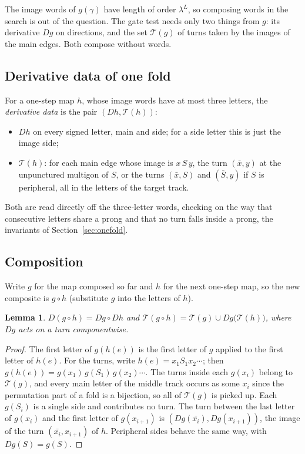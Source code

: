 \documentclass[12pt]{amsart}
\newcommand{\anti}[1]{\bar{#1}}          %
\newcommand{\Dg}{D}                       %
\newcommand{\turns}{\mathcal{T}}
\newcommand{\lam}{\lambda}
\theoremstyle{plain}
\newtheorem{Lemma}[Theorem]{Lemma}
\theoremstyle{definition}
\begin{document}
The image words of $g(\gamma)$ have length of order $\lam^L$, so composing
words in the search is out of the question.  The gate test needs only
two things from $g$: its derivative $\Dg g$ on directions, and the set
$\turns(g)$ of turns taken by the images of the main edges.  Both
compose without words.

\subsection{Derivative data of one fold}
For a one-step map $h$, whose image words have at most three letters,
the \emph{derivative data} is the pair $(\Dg h,\turns(h))$:
\begin{itemize}
  \item $\Dg h$ on every signed letter, main and side; for a side letter
    this is just the image side;
  \item $\turns(h)$: for each main edge whose image is $x\,S\,y$, the
    turn $(\anti x,y)$ at the unpunctured multigon of $S$, or the turns
    $(\anti x,S)$ and $(\anti S,y)$ if $S$ is peripheral, all in the
    letters of the target track.
\end{itemize}
Both are read directly off the three-letter words, checking on the way
that consecutive letters share a prong and that no turn falls inside a
prong, the invariants of Section~\ref{sec:onefold}.

\subsection{Composition}
Write $g$ for the map composed so far and $h$ for the next one-step map,
so the new composite is $g\circ h$ (substitute $g$ into the letters of
$h$).

\begin{Lemma}
  \label{lem:compose}
  $\Dg(g\circ h)=\Dg g\circ\Dg h$ and
  $\turns(g\circ h)=\turns(g)\cup\Dg g\bigl(\turns(h)\bigr)$, where
  $\Dg g$ acts on a turn componentwise.
\end{Lemma}
\begin{proof}
  The first letter of $g(h(e))$ is the first letter of $g$ applied to the
  first letter of $h(e)$.  For the turns, write $h(e)=x_1S_1x_2\cdots$;
  then $g(h(e))=g(x_1)\,g(S_1)\,g(x_2)\cdots$.  The turns inside each
  $g(x_i)$ belong to $\turns(g)$, and every main letter of the middle
  track occurs as some $x_i$ since the permutation part of a fold is a
  bijection, so all of $\turns(g)$ is picked up.  Each $g(S_i)$ is a
  single side and contributes no turn.  The turn between the last letter
  of $g(x_i)$ and the first letter of $g(x_{i+1})$ is
  $(\Dg g(\anti{x_i}),\Dg g(x_{i+1}))$, the image of the turn
  $(\anti{x_i},x_{i+1})$ of $h$.  Peripheral sides behave the same way,
  with $\Dg g(S)=g(S)$.
\end{proof}
\end{document}
